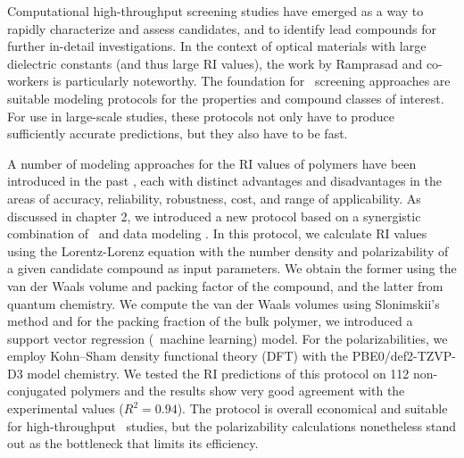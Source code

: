 Computational high-throughput screening studies have emerged as a way to rapidly characterize and assess candidates, and to identify lead compounds for further in-detail investigations.
In the context of optical materials with large dielectric constants (and thus large RI values), the work by Ramprasad and co-workers \cite{Huan2016,Sharma2014,Mannodi-Kanakkithodi2016} is particularly noteworthy.
The foundation for \insilico\ screening approaches are suitable modeling protocols for the properties and compound classes of interest. For use in large-scale studies, these protocols not only have to produce sufficiently accurate predictions, but they also have to be fast. 

A number of modeling approaches for the RI values of polymers have been introduced in the past \cite{Huan2016,Sharma2014,Alexandridis2012,Park2011,Redmond2011,Lisa2010,Yu2007a,Holder2006}, each with distinct advantages and disadvantages in the areas of accuracy, reliability, robustness, cost, and range of applicability. 
As discussed in chapter 2, we introduced a new protocol based on a synergistic combination of \firstprinciples\ and data modeling \cite{Afzal2018a}. In this protocol, we calculate RI values using the  Lorentz-Lorenz equation with the number density and polarizability of a given candidate compound as input parameters. We obtain the former using the van der Waals volume and packing factor of the compound, and the latter from quantum chemistry. We compute the van der Waals volumes using Slonimskii's method \cite{Slonimskii1970} and for the packing fraction of the bulk polymer, we introduced a support vector regression \cite{drucker1997,smola2004} (\ie\ machine learning) model. For the polarizabilities, we employ Kohn--Sham density functional theory (DFT) 
with the PBE0/def2-TZVP-D3 model chemistry. We tested the RI predictions of this protocol on 112 non-conjugated polymers and the results show very good agreement with the experimental values ($R^2=0.94$). 
The protocol is overall economical and suitable for high-throughput \insilico\ studies, but the polarizability calculations nonetheless stand out as the bottleneck that limits its efficiency. 


